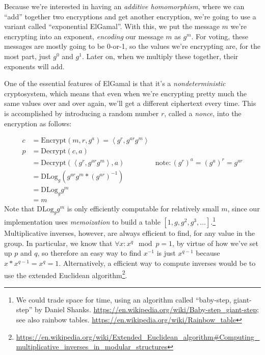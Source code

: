 Because we're interested in having an {\em additive homomorphism},
where we can ``add'' together two encryptions and get another
encryption, we're going to use a variant called ``exponential
ElGamal''. With this, we put the message $m$ we're encrypting into an
exponent, {\em encoding} our message $m$ as $g^m$. For voting, these
messages are mostly going to be 0-or-1, so the values we're encrypting
are, for the most part, just $g^0$ and $g^1$. Later on, when we
multiply these together, their exponents will add.

One of the essential features of ElGamal is that it's a {\em
  nondeterministic} cryptosystem, which means that even when we're
encrypting pretty much the same values over and over again, we'll
get a different ciphertext every time. This is accomplished by
introducing a random number $r$, called a {\em nonce}, into the
encryption as follows:

\begin{align*}
c &= \mathrm{Encrypt}(m, r, g^a) = \left<g^r, g^{ar}g^m\right> \\
p &= \mathrm{Decrypt}(c, a) \\
  &= \mathrm{Decrypt}(\left<g^r, g^{ar}g^m\right>, a) & \mathrm{note:} \left({g^r}\right)^a = \left({g^a}\right)^r = g^{ar} \\
  &= \mathrm{DLog}_g\left(g^{ar}g^m * \left(g^{ar}\right)^{-1}\right) \\
  &= \mathrm{DLog}_gg^m \\
  &= m
\end{align*}
Note that $\mathrm{DLog}_gg^m$ is only efficiently computable for
relatively small $m$, since our implementation uses {\em memoization}
to build a table $\left[1, g, g^2,
g^3, ...\right]$.\footnote{We could trade space for time, using an
algorithm called ``baby-step, giant-step'' by Daniel Shanks.
\url{https://en.wikipedia.org/wiki/Baby-step_giant-step}; see also
rainbow tables. \url{https://en.wikipedia.org/wiki/Rainbow_table}} Multiplicative inverses, however, are always
efficient to find, for any value in the group. In particular, we know
that $\forall x: x^q \mod p = 1$, by virtue of how we've set up $p$
and $q$, so therefore an easy way to find $x^{-1}$ is just $x^{q-1}$
because $x * x^{q-1} = x^q = 1$. Alternatively, a efficient way to
compute inverses would be to use the extended Euclidean algorithm\footnote{\url{https://en.wikipedia.org/wiki/Extended\_Euclidean\_algorithm\#Computing\_multiplicative\_inverses\_in\_modular\_structures}}.


